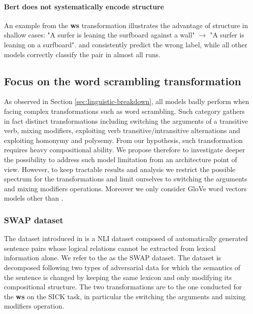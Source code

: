 \paragraph{Bert does not systematically encode structure}

An example from the \textbf{ws} transformation illustrates the advantage of structure in shallow cases: "A surfer is leaning the surfboard against a wall" $\rightarrow$ "A surfer is leaning on a surfboard". \cls and \bow consistently predict the wrong label, while all other models correctly classify the pair in almost all runs. 



\subsection{Focus on the word scrambling transformation}

As observed in Section \ref{sec:linguistic-breakdown}, all models badly perform when facing complex transformations such as word scrambling. Such category gathers in fact distinct transformations including switching the arguments of a transitive verb, mixing modifiers, exploiting verb transitive/intransitive alternations and exploiting homonymy and polysemy. From our hypothesis, such transformation requires heavy compositional  ability. We propose therefore to investigate deeper the possibility to address such model limitation from an architecture point of view. However, to keep tractable results and analysis we restrict the possible spectrum for the transformations and limit ourselves to switching the arguments and mixing modifiers operations. Moreover we only consider GloVe word vectors models other than \bert.

\subsubsection{SWAP dataset}

The dataset introduced in \textcite{nie_19} is a NLI dataset composed of automatically generated sentence pairs whose logical relations cannot be extracted from lexical information alone. We refer to the  as the SWAP dataset. The dataset is decomposed following two types of adversarial data for which the semantics of the sentence is changed by keeping the same lexicon and only modifying its compositional structure. The two transformations are  to the one conducted for the \textbf{ws} on the SICK task, in particular the switching  the arguments and mixing modifiers operation.

